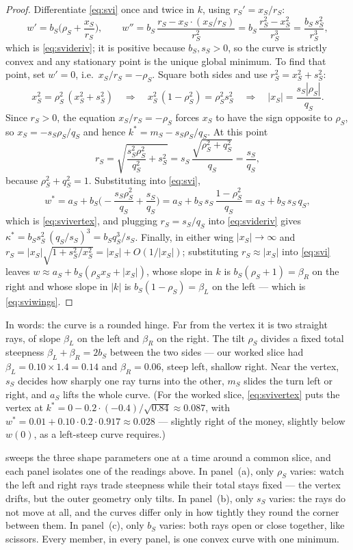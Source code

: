 \begin{proof}
Differentiate \eqref{eq:svi} once and twice in $k$, using
$r_S'=x_S/r_S$:
\[
w'=b_S\Big(\rho_S+\frac{x_S}{r_S}\Big),
\qquad
w''=b_S\,\frac{r_S-x_S\cdot(x_S/r_S)}{r_S^2}
=b_S\,\frac{r_S^2-x_S^2}{r_S^3}
=\frac{b_S\,s_S^2}{r_S^3},
\]
which is \eqref{eq:svideriv}; it is positive because $b_S,s_S>0$, so the
curve is strictly convex and any stationary point is the unique global
minimum.  To find that point, set $w'=0$, i.e.\ $x_S/r_S=-\rho_S$.
Square both sides and use $r_S^2=x_S^2+s_S^2$:
\[
x_S^2=\rho_S^2\,(x_S^2+s_S^2)
\quad\Longrightarrow\quad
x_S^2\,(1-\rho_S^2)=\rho_S^2 s_S^2
\quad\Longrightarrow\quad
|x_S|=\frac{s_S|\rho_S|}{q_S}.
\]
Since $r_S>0$, the equation $x_S/r_S=-\rho_S$ forces $x_S$ to have the
sign opposite to $\rho_S$, so $x_S=-s_S\rho_S/q_S$ and hence
$k^*=m_S-s_S\rho_S/q_S$.  At this point
\[
r_S=\sqrt{\frac{s_S^2\rho_S^2}{q_S^2}+s_S^2}
=s_S\,\frac{\sqrt{\rho_S^2+q_S^2}}{q_S}
=\frac{s_S}{q_S},
\]
because $\rho_S^2+q_S^2=1$.  Substituting into \eqref{eq:svi},
\[
w^*=a_S+b_S\Big(-\frac{s_S\rho_S^2}{q_S}+\frac{s_S}{q_S}\Big)
=a_S+b_S\,s_S\,\frac{1-\rho_S^2}{q_S}
=a_S+b_S\,s_S\,q_S,
\]
which is \eqref{eq:svivertex}, and plugging $r_S=s_S/q_S$ into
\eqref{eq:svideriv} gives
$\kappa^*=b_S s_S^2\,(q_S/s_S)^3=b_S q_S^3/s_S$.  Finally, in either
wing $|x_S|\to\infty$ and
$r_S=|x_S|\sqrt{1+s_S^2/x_S^2}=|x_S|+O(1/|x_S|)$; substituting
$r_S\approx|x_S|$ into \eqref{eq:svi} leaves
$w\approx a_S+b_S(\rho_S x_S+|x_S|)$, whose slope in $k$ is
$b_S(\rho_S+1)=\beta_R$ on the right and whose slope in $|k|$ is
$b_S(1-\rho_S)=\beta_L$ on the left --- which is \eqref{eq:sviwings}.
\end{proof}

In words: the curve is a rounded hinge.  Far from the vertex it is two
straight rays, of slope $\beta_L$ on the left and $\beta_R$ on the
right.  The tilt $\rho_S$ divides a fixed total steepness
$\beta_L+\beta_R=2b_S$ between the two sides --- our worked slice had
$\beta_L=0.10\times1.4=0.14$ and $\beta_R=0.06$, steep left, shallow
right.  Near the vertex, $s_S$ decides how sharply one ray turns into
the other, $m_S$ slides the turn left or right, and $a_S$ lifts the
whole curve.  (For the worked slice, \eqref{eq:svivertex} puts the
vertex at $k^*=0-0.2\cdot(-0.4)/\sqrt{0.84}\approx0.087$, with
$w^*=0.01+0.10\cdot0.2\cdot0.917\approx0.028$ --- slightly right of the
money, slightly below $w(0)$, as a left-steep curve requires.)

 sweeps the three shape parameters one at a time around
a common slice, and each panel isolates one of the readings above.  In
panel~(a), only $\rho_S$ varies: watch the left and right rays trade
steepness while their total stays fixed --- the vertex drifts, but the
outer geometry only tilts.  In panel~(b), only $s_S$ varies: the rays do
not move at all, and the curves differ only in how tightly they round
the corner between them.  In panel~(c), only $b_S$ varies: both rays
open or close together, like scissors.  Every member, in every panel, is
one convex curve with one minimum.

